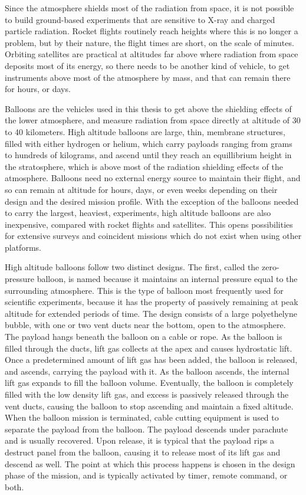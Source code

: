 Since the atmosphere shields most of the radiation from space, it is not possible to build ground-based experiments that are sensitive to X-ray and charged particle radiation. Rocket flights routinely reach heights where this is no longer a problem, but by their nature, the flight times are short, on the scale of minutes. Orbiting satellites are practical at altitudes far above where radiation from space deposits most of its energy, so there needs to be another kind of vehicle, to get instruments above most of the atmosphere by mass, and that can remain there for hours, or days.

Balloons are the vehicles used in this thesis to get above the shielding effects of the lower atmosphere, and measure radiation from space directly at altitude of 30 to 40 kilometers. High altitude balloons are large, thin, membrane structures, filled with either hydrogen or helium, which carry payloads ranging from grams to hundreds of kilograms, and ascend until they reach an equillibrium height in the stratosphere, which is above most of the radiation shielding effects of the atmosphere. Balloons need no external energy source to maintain their flight, and so can remain at altitude for hours, days, or even weeks depending on their design and the desired mission profile. With the exception of the balloons needed to carry the largest, heaviest, experiments, high altitude balloons are also inexpensive, compared with rocket flights and satellites. This opens possibilities for extensive surveys and coincident missions which do not exist when using other platforms. 

High altitude balloons follow two distinct designs. The first, called the zero-pressure balloon, is named because it maintains an internal pressure equal to the surrounding atmosphere. This is the type of balloon most frequently used for scientific experiments, because it has the property of passively remaining at peak altitude for extended periods of time. The design consists of a large polyethelyne bubble, with one or two vent ducts near the bottom, open to the atmosphere. The payload hangs beneath the balloon on a cable or rope. As the balloon is filled through the ducts, lift gas collects at the apex and causes hydrostatic lift. Once a predetermined amount of lift gas has been added, the balloon is released, and ascends, carrying the payload with it. As the balloon ascends, the internal lift gas expands to fill the balloon volume. Eventually, the balloon is completely filled with the low density lift gas, and excess is passively released through the vent ducts, causing the balloon to stop ascending and maintain a fixed altitude. When the balloon mission is terminated, cable cutting equipment is used to separate the payload from the balloon. The payload descends under parachute and is usually recovered. Upon release, it is typical that the payload rips a destruct panel from the balloon, causing it to release most of its lift gas and descend as well. The point at which this process happens is chosen in the design phase of the mission, and is typically activated by timer, remote command, or both. 


